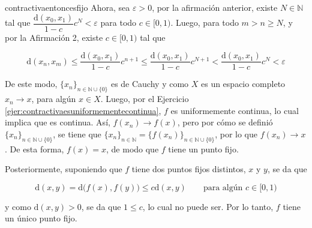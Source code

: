 \documentclass[12pt]{article}
\newenvironment{ejercicio}[1]{\begin{ejer}[breakable, pad at break = 5mm, leftrule = 0.7mm, rightrule = 0.7mm, right = 2mm, left = 2mm, enlarge bottom finally by = 3mm, fontlower = \setlength{\parskip}{2mm}]{}{#1}}{\end{ejer}}
\newcommand{\nat}{\mathbb{N}}
\begin{document}
\begin{ejercicio}{contractivaentoncesfijo}
		Ahora, sea $ \varepsilon > 0 $, por la afirmación anterior, existe $ N \in \nat $ tal que $ \dfrac{\mathrm{d} (x_0, x_1)}{1-c} c^N < \varepsilon $ para todo $ c \in [0,1) $. Luego, para todo $ m > n \geq N $, y por la Afirmación 2, existe $ c \in [0,1) $ tal que \vspace{-3mm}

		\begin{equation*}
			\mathrm{d} (x_n, x_m) \leq \dfrac{\mathrm{d} (x_0, x_1)}{1-c} c^{n+1} \leq \dfrac{\mathrm{d} (x_0, x_1)}{1-c} c^{N+1} < \dfrac{\mathrm{d} (x_0, x_1)}{1-c} c^N < \varepsilon
		\end{equation*}
		
		De este modo, $ \lbrace x_n \rbrace_{n \in \nat \cup \{0\}} $ es de Cauchy y como $ X $ es un espacio completo $ x_n \to x $, para algún $ x \in X $. Luego, por el Ejercicio \ref{ejer:contractivaesuniformementecontinua}, $ f $ es uniformemente continua, lo cual implica que es continua. Así, $ f(x_n) \to f(x) $, pero por cómo se definió $ \lbrace x_n \rbrace_{n \in \nat \cup \{0\}} $, se tiene que $ \lbrace x_n \rbrace_{n \in \nat} = \lbrace f(x_n) \rbrace_{n \in \nat \cup \{0\}} $, por lo que $ f(x_n) \to x $. De esta forma, $ f(x) = x $, de modo que $ f $ tiene un punto fijo.

		Posteriormente, suponiendo que $ f $ tiene dos puntos fijos distintos, $ x $ y $ y $, se da que \vspace{-3mm}
		
		\begin{equation*}
			\mathrm{d} (x, y) = \mathrm{d} \bigl( f(x), f(y) \bigr) \leq c \mathrm{d} (x, y) \qquad \mbox{para algún } c \in [0,1)
		\end{equation*}

		y como $ \mathrm{d} (x, y) > 0 $, se da que $ 1 \leq c $, lo cual no puede ser. Por lo tanto, $ f $ tiene un único punto fijo.
	\end{ejercicio}
	
\end{document}
